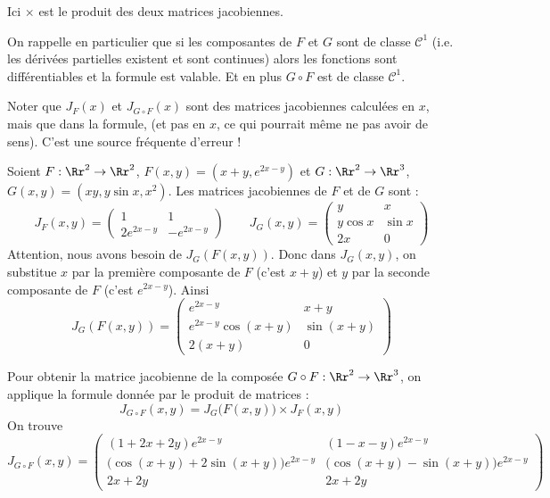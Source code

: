 \documentclass[12pt, class=report,crop=false]{standalone}
\begin{document}
Ici \og{}$\times$\fg{} est le produit des deux matrices jacobiennes.


On rappelle en particulier que si les composantes de $F$ et $G$ sont de classe $\mathcal{C}^1$ (i.e. les dérivées partielles existent et sont continues) alors les fonctions sont différentiables et la formule est valable. Et en plus $G \circ F$ est de classe $\mathcal{C}^1$.

\bigskip

 Noter que $J_F(x)$ et $J_{G \circ F} (x)$ sont des matrices jacobiennes calculées en $x$, mais que  dans la formule,  (et pas en $x$, ce qui pourrait même ne pas avoir de sens). C'est une source fréquente d'erreur !

\begin{exemple}
Soient $F : \Rr^2 \to \Rr^2$, $F(x,y) = (x + y, e^{2x-y})$ et 
$G : \Rr^2 \to \Rr^3$, $G(x,y) = (xy, y\sin x, x^2)$.
Les matrices jacobiennes de $F$ et de $G$ sont :
$$J_F(x,y) = 
\begin{pmatrix}
1&1 \\ 2e^{2x-y} &-e^{2x-y}
\end{pmatrix}
\qquad
J_G(x,y) = 
\begin{pmatrix}
y & x \\ y \cos x & \sin x \\ 2x & 0
\end{pmatrix}$$
Attention, nous avons besoin de $J_G (F(x,y))$. Donc dans $J_G(x,y)$, on substitue $x$ par la première composante de $F$ (c'est $x+y$) et $y$ par la seconde composante de $F$ (c'est $e^{2x-y}$). Ainsi
$$J_G( F(x,y) ) = 
\begin{pmatrix}
e^{2x-y} & x+y \\ e^{2x-y} \cos(x+y) & \sin(x+y) \\ 2(x+y) & 0
\end{pmatrix}$$


Pour obtenir la matrice jacobienne de la composée $G \circ F : \Rr^2 \to \Rr^3$, on applique la formule donnée par le produit de matrices :
$$J_{G \circ F} (x,y) = J_G \big( F(x,y) \big) \times J_F (x,y)$$
On trouve
$$J_{G \circ F} (x,y) 
= 
\begin{pmatrix}
(1+2x+2y)e^{2x-y} & (1-x-y)e^{2x-y} \\
\big( \cos(x+y) + 2\sin(x+y) \big)e^{2x-y} & \big( \cos(x+y) - \sin(x+y) \big)e^{2x-y}\\
2x+2y & 2x+2y
\end{pmatrix}$$
\end{exemple}
\end{document}
